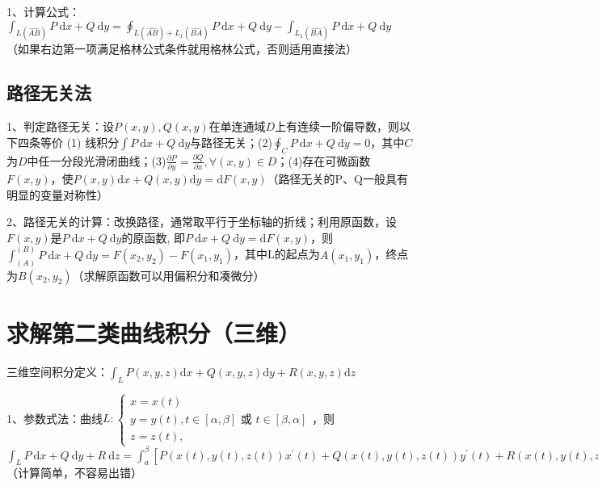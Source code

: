 1、计算公式：$\int_{L(\widehat{A B})} P \mathrm{~d} x+Q \mathrm{~d} y=\oint_{L(\widehat{A B})+L_{1}(\widehat{B A})} P \mathrm{~d} x+Q \mathrm{~d} y-\int_{L_{1}(\widehat{BA})} P \mathrm{~d} x+Q \mathrm{~d} y$（如果右边第一项满足格林公式条件就用格林公式，否则适用直接法）



\subsection{路径无关法}

1、判定路径无关：设$P(x, y), Q(x, y)$在单连通域$D$上有连续一阶偏导数，则以下四条等价 (1) 线积分$\int P \mathrm{~d} x+Q \mathrm{~d} y$与路径无关；(2)$\oint_{C} P \mathrm{~d} x+Q \mathrm{~d} y=0$，其中$C$为$D$中任一分段光滑闭曲线；(3)$\frac{\partial P}{\partial y}=\frac{\partial Q}{\partial x}, \forall(x, y) \in D$；(4)存在可微函数$F(x, y)$，使$P(x, y) \mathrm{d} x+Q(x, y) \mathrm{d} y=\mathrm{d} F(x, y)$（路径无关的P、Q一般具有明显的变量对称性）

2、路径无关的计算：改换路径，通常取平行于坐标轴的折线；利用原函数，设$F(x, y)$是$P \mathrm{~d} x+Q \mathrm{~d} y$的原函数, 即$P \mathrm{~d} x+Q \mathrm{~d} y=\mathrm{d} F(x, y)$，则$\int_{(A)}^{(B)} P \mathrm{~d} x+Q \mathrm{~d} y=F\left(x_{2}, y_{2}\right)-F\left(x_{1}, y_{1}\right)$，其中L的起点为$A\left(x_{1}, y_{1}\right)$，终点为$B\left(x_{2}, y_{2}\right)$（求解原函数可以用偏积分和凑微分）

\section{求解第二类曲线积分（三维）}

三维空间积分定义：$\int_{L} P(x, y, z) \mathrm{d} x+Q(x, y, z) \mathrm{d} y+R(x, y, z) \mathrm{d} z$

1、参数式法：曲线$L:\left\{\begin{array}{l}x=x(t) \\ y=y(t), t \in[\alpha, \beta] \text { 或 } t \in[\beta, \alpha]\\ z=z(t),\end{array}\right.$，则$\int_{L} P \mathrm{~d} x+Q \mathrm{~d} y+R \mathrm{~d} z= \int_{a}^{\beta}\left[P(x(t), y(t), z(t)) x^{\prime}(t)+Q(x(t), y(t), z(t)) y^{\prime}(t)+R(x(t), y(t), z(t)) z^{\prime}(t)\right] \mathrm{d} t$（计算简单，不容易出错）

